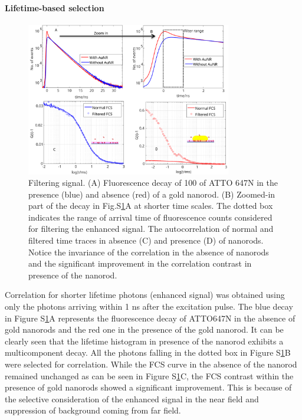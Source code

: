 \paragraph*{Lifetime-based selection}
\begin{figure}%
  \centering
  \includegraphics[width=0.8\textwidth]{lifetime_filtering}
  \makeatletter
  \renewcommand{\fnum@figure}{\figurename~S\thefigure}
  \makeatother{}
  \caption{Filtering signal. (A) Fluorescence decay of \SI{100}{\nM} of ATTO 647N in the presence (blue) and absence (red) of a gold nanorod.
  (B) Zoomed-in part of the decay in Fig.S\ref{SIfig:lifetime-filtering}A at shorter time scales. 
  The dotted box indicates the range of arrival time of fluorescence counts considered for filtering the enhanced signal.
  The autocorrelation of normal and filtered time traces in absence (C) and presence (D) of nanorods. 
  Notice the invariance of the correlation in the absence of nanorods and the significant improvement in the correlation contrast in presence of the nanorod.}
  \label{SIfig:lifetime-filtering}
\end{figure}

Correlation for shorter lifetime photons (enhanced signal) was obtained using only the photons arriving within 1 ns after the excitation pulse.
The blue decay in Figure S\ref{SIfig:lifetime-filtering}A represents the fluorescence decay of ATTO647N in the absence of gold nanorods and the red one in the presence of the gold nanorod. It can be clearly seen that the lifetime histogram in presence of the nanorod exhibits a multicomponent decay.
All the photons falling in the dotted box in Figure S\ref{SIfig:lifetime-filtering}B were selected for correlation.
While the FCS curve in the absence of the nanorod remained unchanged as can be seen in Figure S\ref{SIfig:lifetime-filtering}C, the FCS contrast within the presence of gold nanorods showed a significant improvement.
This is because of the selective consideration of the enhanced signal in the near field and suppression of background coming from far field.

